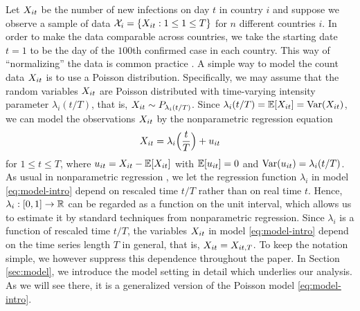 \documentclass[a4paper,12pt]{article}
\numberwithin{equation}{section}
\begin{document}
Let $X_{it}$ be the number of new infections on day $t$ in country $i$ and suppose we observe a sample of data $\mathcal{X}_i = \{ X_{it}: 1 \le 1 \le T \}$ for $n$ different countries $i$. In order to make the data comparable across countries, we take the starting date $t=1$ to be the day of the $100$th confirmed case in each country. This way of ``normalizing'' the data is common practice \citep[cp.\ e.g.][]{Cohen2020}. A simple way to model the count data $X_{it}$ is to use a Poisson distribution. Specifically, we may assume that the random variables $X_{it}$ are Poisson distributed with time-varying intensity parameter $\lambda_i(t/T)$, that is, $X_{it} \sim P_{\lambda_i(t/T)}$. Since $\lambda_i(t/T) = \mathbb{E}[X_{it}] = \textnormal{Var}(X_{it})$, we can model the observations $X_{it}$ by the nonparametric regression equation 
\begin{equation}\label{eq:model-intro}
X_{it} = \lambda_i\Big(\frac{t}{T}\Big) + u_{it} 
\end{equation}
for $1 \le t \le T$, where $u_{it} = X_{it} - \mathbb{E}[X_{it}]$ with $\mathbb{E}[u_{it}] = 0$ and $\textnormal{Var}(u_{it}) = \lambda_i(t/T)$. As usual in nonparametric regression \citep[cp.][]{Robinson1989}, we let the regression function $\lambda_i$ in model \eqref{eq:model-intro} depend on rescaled time $t/T$ rather than on real time $t$. Hence, $\lambda_i: [0,1] \rightarrow \mathbb{R}$ can be regarded as a function on the unit interval, which allows us to estimate it by standard techniques from nonparametric regression. Since $\lambda_i$ is a function of rescaled time $t/T$, the variables $X_{it}$ in model \eqref{eq:model-intro} depend on the time series length $T$ in general, that is, $X_{it} = X_{it,T}$. To keep the notation simple, we however suppress this dependence throughout the paper. In Section \ref{sec:model}, we introduce the model setting in detail which underlies our analysis. As we will see there, it is a generalized version of the Poisson model \eqref{eq:model-intro}.
\end{document}
